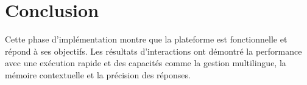 

\section{Conclusion}
Cette phase d’implémentation montre que la plateforme est fonctionnelle et répond à ses objectifs. Les résultats d’interactions ont démontré la performance avec une exécution rapide et des capacités comme la gestion multilingue, la mémoire contextuelle et la précision des réponses.
